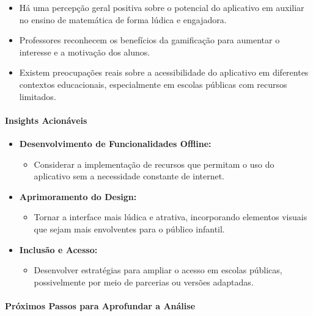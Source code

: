 \begin{itemize}
    \item Há uma percepção geral positiva sobre o potencial do aplicativo em auxiliar no ensino de matemática de forma lúdica e engajadora.
    \item Professores reconhecem os benefícios da gamificação para aumentar o interesse e a motivação dos alunos.
    \item Existem preocupações reais sobre a acessibilidade do aplicativo em diferentes contextos educacionais, especialmente em escolas públicas com recursos limitados.
\end{itemize}

\paragraph{Insights Acionáveis}

\begin{itemize}
    \item \textbf{Desenvolvimento de Funcionalidades Offline:}
    \begin{itemize}
        \item Considerar a implementação de recursos que permitam o uso do aplicativo sem a necessidade constante de internet.
    \end{itemize}
    \item \textbf{Aprimoramento do Design:}
    \begin{itemize}
        \item Tornar a interface mais lúdica e atrativa, incorporando elementos visuais que sejam mais envolventes para o público infantil.
    \end{itemize}
    \item \textbf{Inclusão e Acesso:}
    \begin{itemize}
        \item Desenvolver estratégias para ampliar o acesso em escolas públicas, possivelmente por meio de parcerias ou versões adaptadas.
    \end{itemize}
\end{itemize}

\paragraph{Próximos Passos para Aprofundar a Análise}

